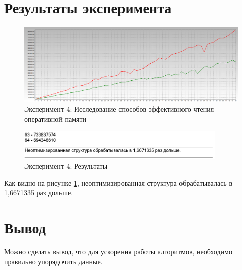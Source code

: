 \section{Результаты эксперимента}
\begin{figure}[ht!]
    \centering
    \includegraphics[width=170mm]{./img/task_04.png}
    \caption{Эксперимент 4: Исследование способов эффективного чтения оперативной памяти}
\end{figure}

\begin{figure}[ht!]
    \centering
    \includegraphics[width=100mm]{./img/res_04.png}
    \caption{Эксперимент 4: Результаты\label{res_04}}
\end{figure}

Как видно на рисунке \ref{res_04}, неоптимизированная структура обрабатывалась в 1,6671335 раз дольше.

\section{Вывод}
Можно сделать вывод, что для ускорения работы алгоритмов, необходимо правильно упорядочить данные.

